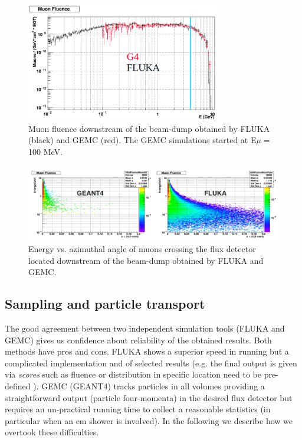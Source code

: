 \begin{figure}[h!] 
\center
\includegraphics[width=8.5cm]{figs/mu-flu-bd.pdf}
\caption{Muon fluence downstream of the beam-dump obtained by FLUKA (black) and GEMC (red). The GEMC simulations started at E$\mu=$100 MeV.}
\label{fig:mu-flu-bd}
\end{figure}

\begin{figure}[h!] 
\center
\includegraphics[width=16cm]{figs/mu-flu-bd-2d.pdf} 
\caption{Energy vs. azimuthal angle of muons crossing the flux detector located downstream of the beam-dump obtained by FLUKA  and GEMC.}
\label{fig:mu-flu-bd-2d}
\end{figure}


\subsection{Sampling  and particle transport}
The good agreement between two independent simulation tools (FLUKA and GEMC)  gives us confidence about reliability of the obtained results. Both methods have pros and cons. FLUKA shows a superior speed in running but a complicated implementation and of selected results (e.g. the final output is given via {\it scores} such as fluence or distribution in specific location  need to be pre-defined ). GEMC (GEANT4) tracks particles in all volumes providing a straightforward  output (particle four-momenta) in the desired flux detector but requires an un-practical running time to collect a reasonable statistics (in particular when an em shower is involved). In the following we describe how we overtook these difficulties.
